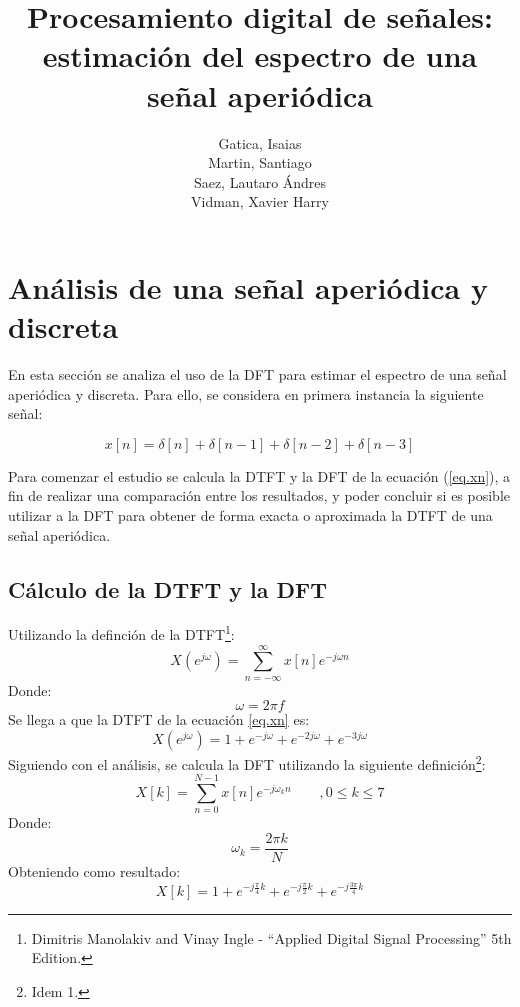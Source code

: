 \documentclass[11pt,a4paper]{article}
\author{Gatica, Isaias \\ Martin, Santiago \\ Saez, Lautaro Ándres \\ Vidman, Xavier Harry}
\title{Procesamiento digital de señales: estimación del espectro de una señal aperiódica}
\date{}
\begin{document}
\maketitle
\section{Análisis de una señal aperiódica y discreta}
En esta sección se analiza el uso de la DFT para estimar el espectro de una señal aperiódica y discreta. Para ello, se considera en primera instancia la siguiente señal:

\begin{equation}
    x[n]=\delta[n]+\delta[n-1]+\delta[n-2]+\delta[n-3]
    \label{eq.xn}
\end{equation}

Para comenzar el estudio se calcula la DTFT y la DFT de la ecuación (\ref{eq.xn}), a fin de realizar una comparación entre los resultados, y poder concluir si es posible utilizar a la DFT para obtener de forma exacta o aproximada la DTFT de una señal aperiódica.

    \subsection{Cálculo de la DTFT y la DFT}

    Utilizando la definción de la DTFT\footnote{Dimitris Manolakiv and Vinay Ingle - ``Applied Digital Signal Processing'' 5th Edition.}:
    \begin{equation}
        X(e^{j\omega})=\sum_{n=-\infty}^{\infty}x[n]e^{-j\omega n}
    \end{equation}
    Donde: 
    \begin{equation}
        \label{omega}
        \omega=2\pi f
    \end{equation}
    Se llega a que la DTFT de la ecuación \ref{eq.xn} es:
    \begin{equation}
        X(e^{j\omega})=1+e^{-j\omega}+e^{-2j\omega}+e^{-3j\omega}
        \label{DTFT.R}
    \end{equation}
    Siguiendo con el análisis, se calcula la DFT utilizando la siguiente definición\footnote{Idem 1.}:
    \begin{equation}
        X[k]=\sum_{n=0}^{N-1}x[n]e^{-j\omega_k n} \qquad , 0 \leq k \leq 7
    \end{equation}
    Donde:
    \begin{equation}
        \label{omega.k}
        \omega_k=\frac{2\pi k}{N}
    \end{equation}
    Obteniendo como resultado:
    \begin{equation}
        \label{DFT.R}
        X[k]=1 + e^{-j \frac{\pi}{4} k} + e^{-j \frac{\pi}{2} k} + e^{-j \frac{3 \pi}{4} k}
    \end{equation}
    
\end{document}

